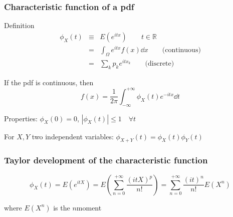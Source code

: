 \documentclass[9pt]{beamer}
\newif\ifmynote
\newcommand\mynote[1]{%
\ifmynote \textbf{#1} \else \fi
}
\begin{document}
\begin{frame}
 \frametitle{Characteristic function of a pdf}
 
 \mynote{Écrire au tableau}
 
 \begin{block}{Definition}
  \begin{eqnarray}
   \phi_X (t) & \equiv & E(e^{itx}) \qquad t \in \mathbb{R} \nonumber \\
   & = & \int_\Omega e^{itx} f(x) \dd x \qquad \text{(continuous)}\nonumber \\
   & = & \sum_k p_k e^{i t x_k}\qquad \text{(discrete)} \nonumber 
  \end{eqnarray}

 \end{block}
 
 If the pdf is continuous, then 
 $$f(x) = \frac{1}{2 \pi} \int_{-\infty}^{+\infty} \phi_X(t) e^{-itx} \dd t$$
 
 Properties: $\phi_X (0) = 0$, $|\phi_X(t)| \leq 1 \quad \forall t$
 
 For $X,Y$ two independent variables: $\phi_{X+Y}(t) = \phi_X(t) \phi_Y(t)$


\end{frame}

\begin{frame}
 \frametitle{Taylor development of the characteristic function}
 
 \begin{block}{}
  $$\phi_X(t) = E(e^{itX}) = E \left( \sum_{n=0}^{+\infty} \frac{(itX)^p}{n!} \right) = \sum_{n=0}^{+\infty} \frac{(it)^n}{n!} E(X^n) $$
  
  where $E(X^n)$ is the $n$\ith moment
 \end{block}
 

\end{frame}
\end{document}
